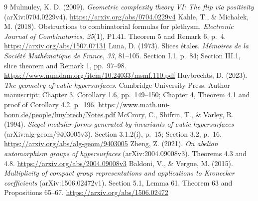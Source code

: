 \begin{thebibliography}{9}
 Mulmuley, K. D. (2009).
\emph{Geometric complexity theory VI: The flip via positivity}
(arXiv:0704.0229v4). \url{https://arxiv.org/abs/0704.0229v4}
Kahle, T., \& Micha\l ek, M. (2018).
Obstructions to combinatorial formulas for plethysm.
\emph{Electronic Journal of Combinatorics, 25}(1), P1.41.
Theorem 5 and Remark 6, p.~4.
\url{https://arxiv.org/abs/1507.07131}
 Luna, D. (1973).
Slices \'etales. \emph{M\'emoires de la Soci\'et\'e Math\'ematique
de France, 33}, 81--105. Section I.1, p.~84; Section III.1,
slice theorem and Remark 1, pp.~97--98.
\url{https://www.numdam.org/item/10.24033/msmf.110.pdf}
 Huybrechts, D. (2023).
\emph{The geometry of cubic hypersurfaces}. Cambridge University Press.
Author manuscript: Chapter 3, Corollary 1.6, pp.~149--150;
Chapter 4, Theorem 4.1 and proof of Corollary 4.2, p.~196.
\url{https://www.math.uni-bonn.de/people/huybrech/Notes.pdf}
 McCrory, C., Shifrin, T.,
\& Varley, R. (1994). \emph{Siegel modular forms generated by
invariants of cubic hypersurfaces} (arXiv:alg-geom/9403005v3).
Section 3.1.2(i), p.~15; Section 3.2, p.~16.
\url{https://arxiv.org/abs/alg-geom/9403005}
 Zheng, Z. (2021).
\emph{On abelian automorphism groups of hypersurfaces}
(arXiv:2004.09008v3). Theorems 4.3 and 4.8.
\url{https://arxiv.org/abs/2004.09008v3}
Baldoni, V., \& Vergne, M. (2015).
\emph{Multiplicity of compact group representations and applications
to Kronecker coefficients} (arXiv:1506.02472v1).
Section 5.1, Lemma 61, Theorem 63 and Propositions 65--67.
\url{https://arxiv.org/abs/1506.02472}
\end{thebibliography}
